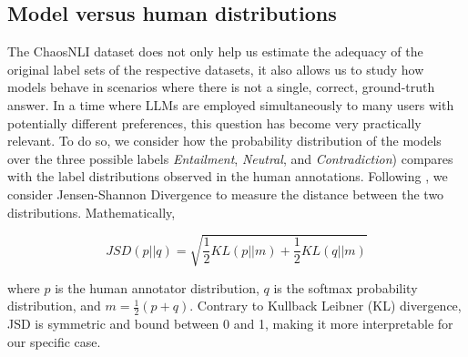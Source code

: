\subsection{Model versus human distributions}\label{subsec:chaosnli_dist}
The ChaosNLI dataset does not only help us estimate the adequacy of the original label sets of the respective datasets, it also allows us to study how models behave in scenarios where there is not a single, correct, ground-truth answer.
In a time where LLMs are employed simultaneously to many users with potentially different preferences, this question has become very practically relevant.
To do so, we consider how the probability distribution of the models over the three possible labels \textit{Entailment}, \textit{Neutral}, and \textit{Contradiction}) compares with the label distributions observed in the human annotations.
Following \citet{nie-etal-2020-learn}, we consider Jensen-Shannon Divergence \citep[JSD][]{menendez1997jensen} to measure the distance between the two distributions. Mathematically,

\[
    JSD(p || q) = \sqrt{\frac{1}{2}KL(p || m) + \frac{1}{2}KL(q || m)}
\]

where $p$ is the human annotator distribution, $q$ is the softmax probability distribution, and $m = \frac{1}{2}(p + q)$. Contrary to Kullback Leibner (KL) divergence, JSD is symmetric and bound between 0 and 1, making it more interpretable for our specific case.

